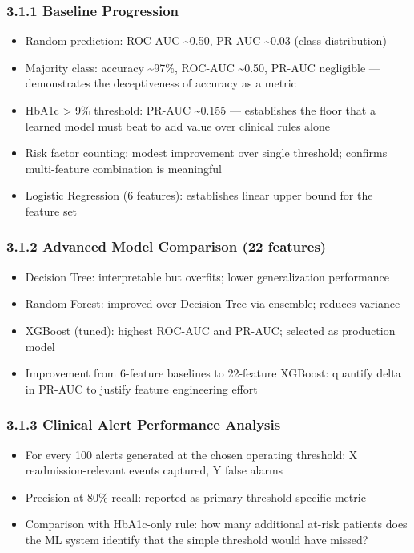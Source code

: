 \documentclass[11pt,a4paper]{article}
\begin{document}
\subsubsection{3.1.1 Baseline Progression}
\begin{itemize}
\item Random prediction: ROC-AUC \textasciitilde{}0.50, PR-AUC \textasciitilde{}0.03 (class distribution)
\item Majority class: accuracy \textasciitilde{}97\%, ROC-AUC \textasciitilde{}0.50, PR-AUC negligible --- demonstrates the deceptiveness of accuracy as a metric
\item HbA1c > 9\% threshold: PR-AUC \textasciitilde{}0.155 --- establishes the floor that a learned model must beat to add value over clinical rules alone
\item Risk factor counting: modest improvement over single threshold; confirms multi-feature combination is meaningful
\item Logistic Regression (6 features): establishes linear upper bound for the feature set
\end{itemize}

\subsubsection{3.1.2 Advanced Model Comparison (22 features)}
\begin{itemize}
\item Decision Tree: interpretable but overfits; lower generalization performance
\item Random Forest: improved over Decision Tree via ensemble; reduces variance
\item XGBoost (tuned): highest ROC-AUC and PR-AUC; selected as production model
\item Improvement from 6-feature baselines to 22-feature XGBoost: quantify delta in PR-AUC to justify feature engineering effort
\end{itemize}

\subsubsection{3.1.3 Clinical Alert Performance Analysis}
\begin{itemize}
\item For every 100 alerts generated at the chosen operating threshold: X readmission-relevant events captured, Y false alarms
\item Precision at 80\% recall: reported as primary threshold-specific metric
\item Comparison with HbA1c-only rule: how many additional at-risk patients does the ML system identify that the simple threshold would have missed?
\end{itemize}
\end{document}
